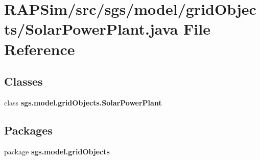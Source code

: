 \section{R\-A\-P\-Sim/src/sgs/model/grid\-Objects/\-Solar\-Power\-Plant.java File Reference}
\label{_solar_power_plant_8java}
\subsection*{Classes}
\begin{DoxyCompactItemize}
\item 
class {\bf sgs.\-model.\-grid\-Objects.\-Solar\-Power\-Plant}
\end{DoxyCompactItemize}
\subsection*{Packages}
\begin{DoxyCompactItemize}
\item 
package {\bf sgs.\-model.\-grid\-Objects}
\end{DoxyCompactItemize}
